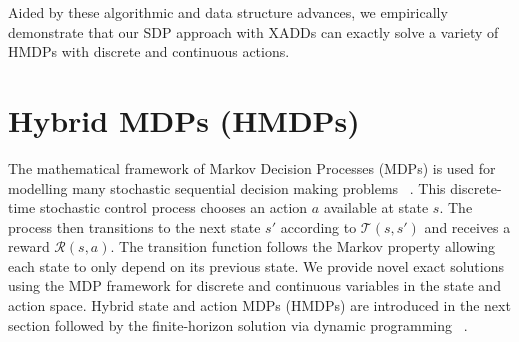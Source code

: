 \documentclass[twoside,11pt]{article}
\begin{document}
Aided by these algorithmic and data structure advances, we empirically demonstrate that our SDP approach with XADDs can exactly solve a variety of HMDPs with discrete and continuous actions. 


\section{Hybrid MDPs (HMDPs)}
The mathematical framework of Markov Decision Processes (MDPs) is used for modelling many stochastic sequential decision making problems ~\cite{bellman}. This discrete-time stochastic control process chooses an action $a$ available at state $s$. The process then transitions to the next state $s'$ according to $\mathcal{T}(s,s')$ and receives a reward $\mathcal{R}(s,a)$. The transition function follows the Markov property allowing each state to only depend on its previous state.  We provide novel exact solutions using the MDP framework for discrete and continuous variables in the state and action space. Hybrid state and action MDPs (HMDPs) are introduced in the next section followed by the finite-horizon solution via dynamic programming ~\cite{li05}.
\end{document}
